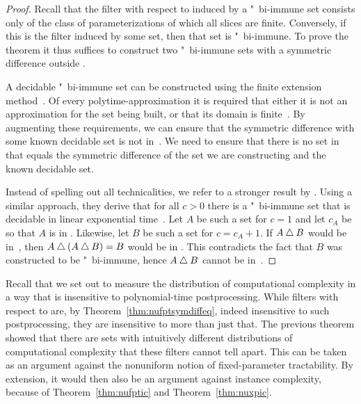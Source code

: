 \begin{proof}
  Recall that the filter with respect to  induced by a "~bi-immune set consists only of the class of parameterizations of which all slices are finite.
  Conversely, if this is the filter induced by some set, then that set is "~bi-immune.
  To prove the theorem it thus suffices to construct two "~bi-immune sets with a symmetric difference outside .

  A decidable "~bi-immune set can be constructed using the finite extension method~\parencite{downey2010algorithmic}.
  Of every polytime-approximation it is required that either it is not an approximation for the set being built, or that its domain is finite~\parencite{balcazar1990structural}.
  By augmenting these requirements, we can ensure that the symmetric difference with some known decidable set is not in~.
  We need to ensure that there is no set in~ that equals the symmetric difference of the set we are constructing and the known decidable set.

  Instead of spelling out all technicalities, we refer to a stronger result by \textcite{geske1991note}.
  Using a similar approach, they derive that for all $c > 0$ there is a "~bi-immune set that is decidable in linear exponential time~\parencite{mayordomo1994almost}.
  Let $A$ be such a set for $c = 1$ and let $c_A$ be so that $A$ is in .
  Likewise, let $B$ be such a set for $c = c_A + 1$.
  If $A \bigtriangleup B$ would be in~, then $A \bigtriangleup (A \bigtriangleup B) = B$ would be in .
  This contradicts the fact that $B$ was constructed to be "~bi-immune, hence $A \bigtriangleup B$ cannot be in~.
\end{proof}

Recall that we set out to measure the distribution of computational complexity in a way that is insensitive to polynomial-time postprocessing.
While filters with respect to  are, by Theorem~\ref{thm:nufptsymdiffeq}, indeed insensitive to such postprocessing, they are insensitive to more than just that.
The previous theorem showed that there are sets with intuitively different distributions of computational complexity that these filters cannot tell apart.
This can be taken as an argument against the nonuniform notion of fixed-parameter tractability.
By extension, it would then also be an argument against instance complexity, because of Theorem~\ref{thm:nufptic} and Theorem~\ref{thm:nuxpic}.

